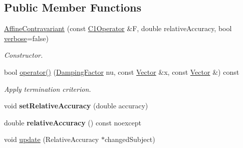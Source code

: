 \subsection*{Public Member Functions}
\begin{DoxyCompactItemize}
\item 
\hypertarget{classSpacy_1_1Newton_1_1Termination_1_1AffineContravariant_a7ae18339e997359b39e7386565d98a8b}{}\hyperlink{classSpacy_1_1Newton_1_1Termination_1_1AffineContravariant_a7ae18339e997359b39e7386565d98a8b}{Affine\+Contravariant} (const \hyperlink{classSpacy_1_1C1Operator}{C1\+Operator} \&F, double relative\+Accuracy, bool \hyperlink{classSpacy_1_1Mixin_1_1Verbosity_ad367a7328578546938fd2a7e52ab3793}{verbose}=false)\label{classSpacy_1_1Newton_1_1Termination_1_1AffineContravariant_a7ae18339e997359b39e7386565d98a8b}

\begin{DoxyCompactList}\small\item\em Constructor. \end{DoxyCompactList}\item 
bool \hyperlink{classSpacy_1_1Newton_1_1Termination_1_1AffineContravariant_a16b9829fd882e948b5d273b80c549f4b}{operator()} (\hyperlink{classSpacy_1_1DampingFactor}{Damping\+Factor} nu, const \hyperlink{classSpacy_1_1Vector}{Vector} \&x, const \hyperlink{classSpacy_1_1Vector}{Vector} \&) const 
\begin{DoxyCompactList}\small\item\em Apply termination criterion. \end{DoxyCompactList}\item 
\hypertarget{classSpacy_1_1Mixin_1_1RelativeAccuracy_aee88b71e80aca446a179f1310408a1e3}{}void {\bfseries set\+Relative\+Accuracy} (double accuracy)\label{classSpacy_1_1Mixin_1_1RelativeAccuracy_aee88b71e80aca446a179f1310408a1e3}

\item 
\hypertarget{classSpacy_1_1Mixin_1_1RelativeAccuracy_a1da618cf9265c2edae354524df4a7f8a}{}double {\bfseries relative\+Accuracy} () const noexcept\label{classSpacy_1_1Mixin_1_1RelativeAccuracy_a1da618cf9265c2edae354524df4a7f8a}

\item 
\hypertarget{classSpacy_1_1Mixin_1_1RelativeAccuracy_acf0b58224d9a2879d05b5d2947f37527}{}void \hyperlink{classSpacy_1_1Mixin_1_1RelativeAccuracy_acf0b58224d9a2879d05b5d2947f37527}{update} (Relative\+Accuracy $\ast$changed\+Subject)\label{classSpacy_1_1Mixin_1_1RelativeAccuracy_acf0b58224d9a2879d05b5d2947f37527}


\end{DoxyCompactItemize}
